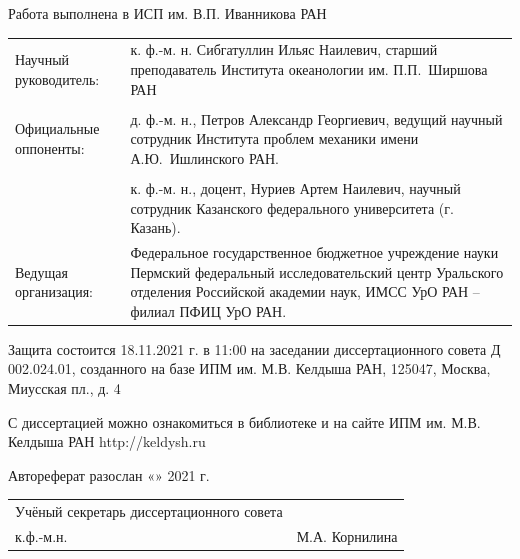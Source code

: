\documentclass[utf8x]{G7-32} %
\begin{document}
\newpage
\pagestyle{empty}
\begin{spacing}{1.2}
\pagestyle{empty}
\begin{flushleft}
  Работа выполнена в ИСП им. В.П. Иванникова РАН
\end{flushleft}
\pagestyle{empty}
\begin{flushleft}
\begin{tabular}{p{5.8cm} p{10.5cm}}
    Научный руководитель: & к. ф.-м. н. Сибгатуллин Ильяс Наилевич, старший преподаватель Института океанологии им. П.П.~Ширшова РАН  \\

    \\

    Официальные оппоненты: &  д. ф.-м. н., Петров Александр Георгиевич, ведущий научный сотрудник Института проблем механики имени А.Ю.~Ишлинского РАН. \\

    \\

    & к. ф.-м. н., доцент, Нуриев Артем Наилевич, научный сотрудник Казанского федерального университета (г. Казань).
    
    \\

    Ведущая организация: &  Федеральное государственное бюджетное учреждение науки Пермский  федеральный  исследовательский  центр  Уральского  отделения Российской академии наук, ИМСС УрО РАН – филиал ПФИЦ УрО РАН.
    
\end{tabular}
\end{flushleft}

\begin{flushleft}
    Защита состоится 18.11.2021 г. в 11:00 на заседании диссертационного совета Д 002.024.01, созданного на базе ИПМ им. М.В. Келдыша РАН, 125047, Москва, Миусская пл., д. 4

    \setlength{\parskip}{1em}

    С диссертацией можно ознакомиться в библиотеке и на сайте ИПМ им. М.В. Келдыша РАН http://keldysh.ru 

    \setlength{\parskip}{1em}
    \vspace{1cm}
    Автореферат разослан «\underline{\hspace{1cm}}» \underline{\hspace{4cm}} 2021 г.    
\end{flushleft}
\vspace{2cm}
\setlength{\parskip}{1em}
\begin{flushleft}
    \begin{tabular}{p{10cm} p{5cm}}

        Учёный секретарь диссертационного совета \\ к.ф.-м.н.  
    & М.А. Корнилина  
        
    \end{tabular}
\end{flushleft}
\end{spacing}
\newpage
\end{document}
